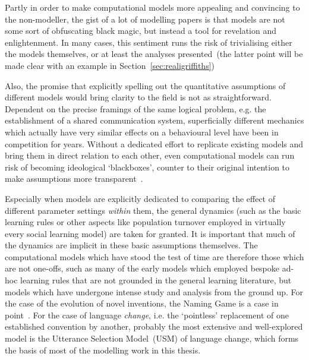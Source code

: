 Partly in order to make computational models more appealing and convincing to the non-modeller, the gist of a lot of modelling papers is that models are not some sort of obfuscating black magic, but instead a tool for revelation and enlightenment.
In many cases, this sentiment runs the risk of trivialising either the models themselves, or at least the analyses presented~(the latter point will be made clear with an example in Section~\ref{sec:realigriffiths})


Also, the promise that explicitly spelling out the quantitative assumptions of different models would bring clarity to the field is not as straightforward. Dependent on the precise framings of the same logical problem, e.g. the establishment of a shared communication system, superficially different mechanics which actually have very similar effects on a behavioural level have been in competition for years. Without a dedicated effort to replicate existing models and bring them in direct relation to each other, even computational models can run risk of becoming ideological `blackboxes', counter to their original intention to make assumptions more transparent~\citep[see][for the exemplary case of proposed pressures]{Spike2016}.


Especially when models are explicitly dedicated to comparing the effect of different parameter settings \emph{within} them, the general dynamics (such as the basic learning rules or other aspects like population turnover employed in virtually every social learning model) are taken for granted. It is important that much of the dynamics are implicit in these basic assumptions themselves. The computational models which have stood the test of time are therefore those which are not one-offs, such as many of the early models which employed bespoke ad-hoc learning rules that are not grounded in the general learning literature, but models which have undergone intense study and analysis from the ground up. For the case of the evolution of novel inventions, the Naming Game is a case in point~\citep{Baronchelli2008}. For the case of language \emph{change}, i.e. the `pointless' replacement of one established convention by another, probably the most extensive and well-explored model is the Utterance Selection Model~(USM) of language change, which forms the basis of most of the modelling work in this thesis.

